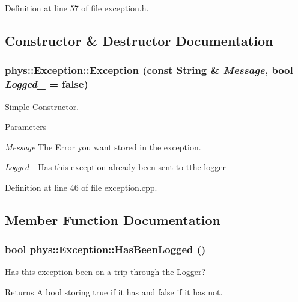 Definition at line 57 of file exception.h.



\subsection{Constructor \& Destructor Documentation}
\hypertarget{classphys_1_1Exception_a73fd1d2603e30f5663fef2d64df5179f}{
\subsubsection[{Exception}]{\setlength{\rightskip}{0pt plus 5cm}phys::Exception::Exception (const {\bf String} \& {\em Message}, \/  bool {\em Logged\_\-} = {\ttfamily false})}}
\label{dc/d47/classphys_1_1Exception_a73fd1d2603e30f5663fef2d64df5179f}


Simple Constructor. 


\begin{DoxyParams}{Parameters}
\item[{\em Message}]The Error you want stored in the exception. \item[{\em Logged\_\-}]Has this exception already been sent to tthe logger \end{DoxyParams}


Definition at line 46 of file exception.cpp.



\subsection{Member Function Documentation}
\hypertarget{classphys_1_1Exception_ab1399e25435c390db551855fda338951}{
\subsubsection[{HasBeenLogged}]{\setlength{\rightskip}{0pt plus 5cm}bool phys::Exception::HasBeenLogged ()}}
\label{dc/d47/classphys_1_1Exception_ab1399e25435c390db551855fda338951}


Has this exception been on a trip through the Logger? 

\begin{DoxyReturn}{Returns}
A bool storing true if it has and false if it has not. 
\end{DoxyReturn}


